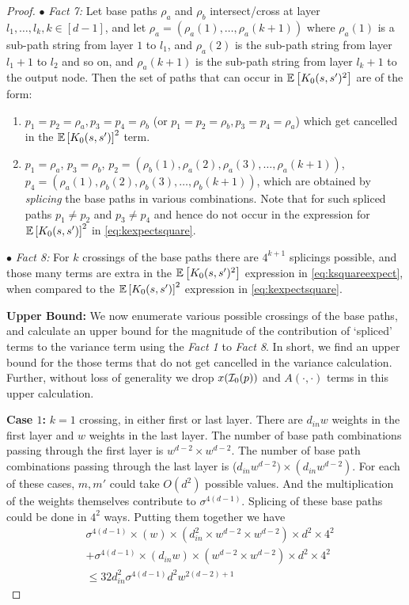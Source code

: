 \begin{appendix}
\begin{proof}
$\bullet$ \emph{Fact 7:} Let base paths $\rho_a$ and $\rho_b$ intersect/cross at layer $l_1, \ldots, l_k, k \in [d-1]$, and let $\rho_a=(\rho_a(1),\ldots,\rho_a(k+1))$ where $\rho_a(1)$ is a sub-path string from layer $1$ to $l_1$, and $\rho_a(2)$ is the sub-path string from layer $l_1+1$ to $l_2$ and so on, and $\rho_a(k+1)$ is the sub-path string from layer $l_k+1$ to the output node. Then the set of paths that can occur in $\mathbb{E}\left[K_0(s,s')^2\right]$ are of the form:
\begin{enumerate}
\item $p_1=p_2=\rho_a, p_3=p_4=\rho_b$ (or $p_1=p_2=\rho_b, p_3=p_4=\rho_a$) which get cancelled in the $\mathbb{E}\left[K_0(s,s')\right]^2$ term.
\item $p_1=\rho_a$, $p_3=\rho_b$, $p_2=(\rho_b(1),\rho_a(2),\rho_a(3),\ldots,\rho_a(k+1))$, $p_4=(\rho_a(1),\rho_b(2),\rho_b(3),\ldots,\rho_b(k+1))$, which are obtained by \emph{splicing} the base paths in various combinations. Note that for such spliced paths $p_1\neq p_2$ and $p_3\neq p_4$ and hence do not occur in the expression for $\mathbb{E}\left[K_0(s,s')\right]^2$ in \eqref{eq:kexpectsquare}.
\end{enumerate}


$\bullet$ \emph{Fact 8:} For $k$ crossings of the base paths there are $4^{k+1}$ splicings possible, and those many terms are extra in the $\mathbb{E}\left[K_0(s,s')^2\right]$ expression in \eqref{eq:ksquareexpect}, when compared to the $\mathbb{E}\left[K_0(s,s')\right]^2$ expression in \eqref{eq:kexpectsquare}. 

\textbf{Upper Bound:} We now enumerate various possible crossings of the base paths, and calculate an upper bound for the magnitude of the contribution of `spliced' terms to the variance term using the \emph{Fact 1} to \emph{Fact 8}. In short, we find an upper bound for the those terms that do not get cancelled in the variance calculation. Further, without loss of generality we drop $x(\mathcal{I}_0(p))$ and $A(\cdot,\cdot)$ terms in this upper calculation.

\textbf{Case $1$:} $k=1$ crossing, in either first or last layer. There are $d_{in}w$ weights in the first layer and $w$ weights in the last layer. The number of base path combinations passing through the first layer is $w^{d-2}\times w^{d-2}$. The number of base path combinations passing through the last layer is ($d_{in}w^{d-2})\times (d_{in}w^{d-2})$.  For each of these cases, $m,m'$ could take $O(d^2)$ possible values. And the multiplication of the weights themselves contribute to $\sigma^{4(d-1)}$.  Splicing of these base paths could be done in $4^2$ ways. Putting them together we have
\begin{align*}
&\sigma^{4(d-1)}\times(w)\times (d^2_{in} \times w^{d-2}\times w^{d-2})\times d^2\times 4^2\\
&+\sigma^{4(d-1)}\times (d_{in}w) \times(w^{d-2}\times w^{d-2}) \times d^2\times  4^2\\
&\leq 32d^2_{in}\sigma^{4(d-1)}d^2 w^{2(d-2)+1}
\end{align*}


\end{proof}
\end{appendix}
